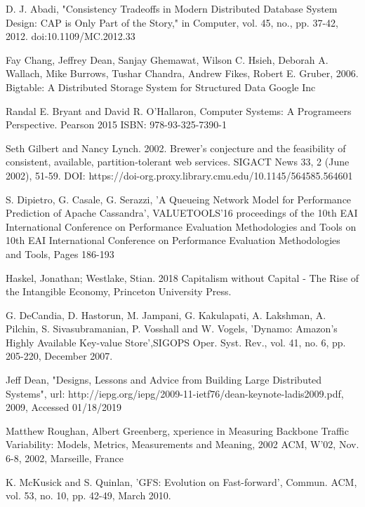 \documentclass[conference]{IEEEtran}
\begin{document}
\begin{thebibliography}{00}

 D. J. Abadi, "Consistency Tradeoffs in Modern Distributed Database System Design: CAP is Only Part of the Story," in Computer, vol. 45, no., pp. 37-42, 2012. 
doi:10.1109/MC.2012.33

Fay Chang, Jeffrey Dean, Sanjay Ghemawat, Wilson C. Hsieh, Deborah A. Wallach, Mike Burrows, Tushar Chandra, Andrew Fikes, Robert E. Gruber, 2006. Bigtable: A Distributed Storage System for Structured Data  Google Inc

Randal E. Bryant and David R. O'Hallaron, Computer Systems: A Programeers Perspective. Pearson 2015 ISBN: 978-93-325-7390-1

 Seth Gilbert and Nancy Lynch. 2002. Brewer's conjecture and the feasibility of consistent, available, partition-tolerant web services. SIGACT News 33, 2 (June 2002), 51-59. DOI: https://doi-org.proxy.library.cmu.edu/10.1145/564585.564601

S. Dipietro, G. Casale, G. Serazzi, 'A Queueing Network Model for Performance Prediction of Apache Cassandra', VALUETOOLS'16 proceedings of the 10th EAI International Conference on Performance Evaluation Methodologies and Tools on 10th EAI International Conference on Performance Evaluation Methodologies and Tools, Pages 186-193 

Haskel, Jonathan; Westlake, Stian. 2018 Capitalism without Capital - The Rise of the Intangible Economy, Princeton University Press. 

 G. DeCandia, D. Hastorun, M. Jampani, G. Kakulapati,  A. Lakshman, A. Pilchin, S. Sivasubramanian, P. Vosshall  and W. Vogels, 'Dynamo: Amazon’s Highly Available Key-value Store',SIGOPS Oper. Syst. Rev., vol. 41, no. 6, pp. 205-220, December 2007.

 Jeff Dean, "Designs, Lessons and Advice from Building Large Distributed Systems", url: http://iepg.org/iepg/2009-11-ietf76/dean-keynote-ladis2009.pdf, 2009, Accessed 01/18/2019

 Matthew Roughan, Albert Greenberg, xperience in Measuring Backbone Traffic Variability: Models, Metrics, Measurements and Meaning, 2002 ACM, W'02, Nov. 6-8, 2002, Marseille, France

K. McKusick and S. Quinlan, 'GFS: Evolution on Fast-forward', Commun. ACM, vol. 53, no. 10, pp. 42-49, March 2010.


\end{thebibliography}
\end{document}
